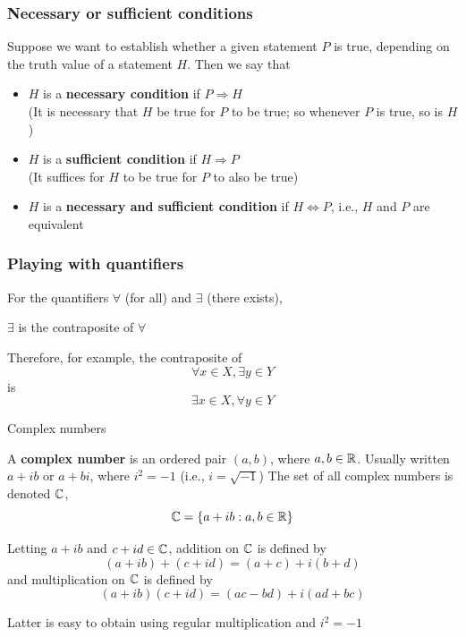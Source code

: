 \documentclass[aspectratio=169]{beamer}\usepackage[]{graphicx}\usepackage[]{xcolor}
\begin{document}
\begin{frame}
\frametitle{Necessary or sufficient conditions}
	Suppose we want to establish whether a given statement $P$ is true, depending
	on the truth value of a statement $H$. Then we say that
	\begin{itemize}
		\item $H$ is a \textbf{necessary condition} if $P\Rightarrow H$ \\
		(It is necessary that $H$ be true for $P$ to be true; so whenever
		$P$ is true, so is $H$)
		\vfill
		\item $H$ is a \textbf{sufficient condition} if $H\Rightarrow P$ \\
		(It suffices for $H$ to be true for $P$ to also be true)
		\vfill
		\item $H$ is a \textbf{necessary and sufficient condition} if $H\Leftrightarrow
		P$, i.e., $H$ and $P$ are equivalent
	\end{itemize}
\end{frame}

\begin{frame}
\frametitle{Playing with quantifiers}
	For the quantifiers $\forall$ (for all) and $\exists$ (there exists),
	\begin{center}
		$\exists$ is the contraposite of $\forall$
	\end{center}
	\vfill
	Therefore, for example, the contraposite of
	\[
	\forall x\in X,\exists y\in Y
	\]
	is
	\[
	\exists x\in X,\forall y\in Y
	\]
\end{frame}


\begin{frame}{Complex numbers}
	\begin{definition}
		A \textbf{complex number} is an ordered pair $(a,b)$, where $a,b\in\mathbb{R}$. Usually written $a+ib$ or $a+bi$, where $i^2=-1$ (i.e., $i=\sqrt{-1}$)
		\vfill
		The set of all complex numbers is denoted $\mathbb{C}$, 
		\[
		\mathbb{C}=\{a+ib: a,b\in\mathbb{R}\}
		\]
	\end{definition}
\end{frame}

\begin{frame}
	\begin{definition}
		Letting $a+ib$ and $c+id\in\mathbb{C}$, addition on $\mathbb{C}$ is defined by
		\[
		(a+ib)+(c+id) = (a+c)+i(b+d)
		\]
		and multiplication on $\mathbb{C}$ is defined by
		\[
		(a+ib)(c+id) = (ac-bd)+i(ad+bc)
		\]
	\end{definition}
	\vfill
	Latter is easy to obtain using regular multiplication and $i^2=-1$
\end{frame}
\end{document}
